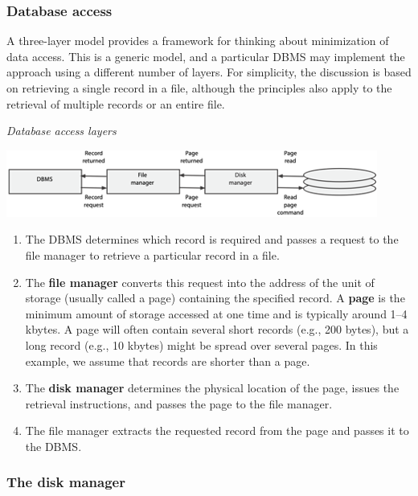 \documentclass[
]{article}
\begin{document}
\hypertarget{database-access}{%
\subsubsection*{Database access}\label{database-access}}

A three-layer model provides a framework for thinking about minimization
of data access. This is a generic model, and a particular DBMS may
implement the approach using a different number of layers. For
simplicity, the discussion is based on retrieving a single record in a
file, although the principles also apply to the retrieval of multiple
records or an entire file.

\emph{Database access layers}

\includegraphics{Figures/Chapter 20/database-access-layers.png}

\begin{enumerate}
\def\labelenumi{\arabic{enumi}.}
\item
  The DBMS determines which record is required and passes a request to
  the file manager to retrieve a particular record in a file.
\item
  The \textbf{file manager} converts this request into the address of the
  unit of storage (usually called a page) containing the specified
  record. A \textbf{page} is the minimum amount of storage accessed at one
  time and is typically around 1--4 kbytes. A page will often contain
  several short records (e.g., 200 bytes), but a long record (e.g., 10
  kbytes) might be spread over several pages. In this example, we
  assume that records are shorter than a page.
\item
  The \textbf{disk manager} determines the physical location of the page,
  issues the retrieval instructions, and passes the page to the file
  manager.
\item
  The file manager extracts the requested record from the page and
  passes it to the DBMS.
\end{enumerate}

\hypertarget{the-disk-manager}{%
\subsubsection*{The disk manager}\label{the-disk-manager}}
\end{document}
